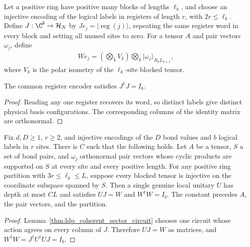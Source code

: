 \begin{definition}
    \label{def:ldp_register_block_encoders}
    \leanok
    Let a positive ring have positive many blocks of lengths $\ell_k$,
    and choose an injective encoding of the logical labels in registers
    of length $r$, with $2r\le\ell_k$. Define $J:\C^b\to\mathcal H_N$
    by $Je_j=|\operatorname{reg}(j)\rangle$, repeating the same register
    word in every block and setting all unused sites to zero. For a
    tensor $A$ and pair vectors $\omega_j$, define
    \begin{align}
        We_j=\left(\bigotimes_k V_k\right)
        \bigotimes_k|\omega_j\rangle_{R_kL_{k+1}},
        \label{eq:ldp_block_encoder_columns}
    \end{align}
    where $V_k$ is the polar isometry of the $\ell_k$-site blocked tensor.
\end{definition}

\begin{lemma}
    \label{thm:ldp_register_encoder_isometric}
    \leanok
    The common register encoder satisfies $J^\dagger J=I_b$.
\end{lemma}
\begin{proof}\leanok
    Reading any one register recovers its word, so distinct labels give
    distinct physical basis configurations. The corresponding columns
    of the identity matrix are orthonormal.
\end{proof}

\begin{lemma}
    \label{thm:ldp_whole_block_encoder}
    \leanok
    Fix $d,D\ge1$, $r\ge2$, and injective encodings of the $D$ bond
    values and $b$ logical labels in $r$ sites. There is $C$ such that
    the following holds. Let $A$ be a tensor, $S$ a set of bond pairs,
    and $\omega_j$ orthonormal pair vectors whose cyclic products are
    supported on $S$ at every site and every positive length. For any
    positive ring partition with $3r\le\ell_k\le L$, suppose every
    blocked tensor is injective on the coordinate subspace spanned by
    $S$. Then a single genuine local unitary $U$ has depth at most $CL$
    and satisfies $UJ=W$ and $W^\dagger W=I_b$.
    The constant precedes $A$, the pair vectors, and the partition.
\end{lemma}
\begin{proof}\leanok
    Lemma~\ref{thm:ldp_coherent_sector_circuit} chooses one circuit
    whose action agrees on every column of $J$. Therefore $UJ=W$ as
    matrices, and $W^\dagger W=J^\dagger U^\dagger UJ=I_b$.
\end{proof}

